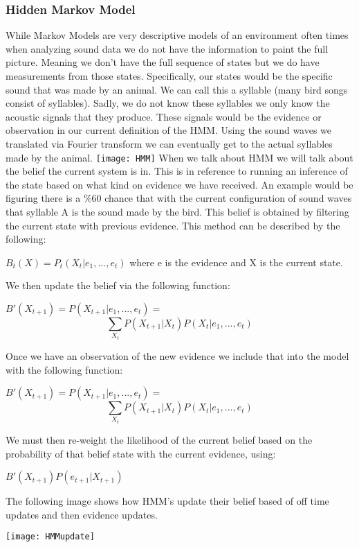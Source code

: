 \subsubsection{Hidden Markov Model}
While Markov Models are very descriptive models of an environment often times when analyzing sound data we do not have the information to paint the full picture. Meaning we don't have the full sequence of states but we do have measurements from those states. Specifically, our states would be the specific sound that was made by an animal. We can call this a syllable (many bird songs consist of syllables). Sadly, we do not know these syllables we only know the acoustic signals that they produce. These signals would be the evidence or observation in our current definition of the HMM. Using the sound waves we translated via Fourier transform we can eventually get to the actual syllables made by the animal. 
\texttt{[image: HMM]}
When we talk about HMM we will talk about the belief the current system is in. This is in reference to running an inference of the state based on what kind on evidence we have received. An example would be figuring there is a \%60 chance that with the current configuration of sound waves that syllable A is the sound made by the bird. This belief is obtained by filtering the current state with previous evidence. This method can be described by the following:
\vspace{10px}
\begin{center}
	$B_{t}(X)=P_{t}(X_{t}|e_{1},...,e_{t})$ where e is the evidence and X is the current state.
\end{center}
\vspace{10px}
We then update the belief via the following function:
\vspace{10px}
\begin{center}
	$B'(X_{t+1})=P(X_{t+1}|e_{1},...,e_{t})=$$$\sum_{X_{t}}P(X_{t+1}|X_{t})P(X_{t}|e_{1},...,e_{t})$$
\end{center}
\vspace{10px}
Once we have an observation of the new evidence we include that into the model with the following function:
\vspace{10px}
\begin{center}
	$B'(X_{t+1})=P(X_{t+1}|e_{1},...,e_{t})=$$$\sum_{X_{t}}P(X_{t+1}|X_{t})P(X_{t}|e_{1},...,e_{t})$$
\end{center}
\vspace{10px}
We must then re-weight the likelihood of the current belief based on the probability of that belief state with the current evidence, using:
\vspace{10px}
\begin{center}
	$B'(X_{t+1})P(e_{t+1}|X_{t+1})$
\end{center}
\vspace{10px}
The following image shows how HMM's update their belief based of off time updates and then evidence updates.
\begin{center}
\texttt{[image: HMMupdate]}
\end{center}
